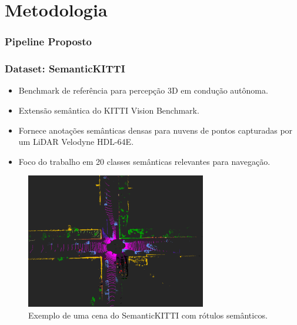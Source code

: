 \documentclass[aspectratio=169,t,xcolor=table]{beamer}
\begin{document}
\section{Metodologia}

\begin{frame}
    \frametitle{Pipeline Proposto}
    \begin{figure}
        \centering
    \end{figure}
\end{frame}

\begin{frame}
    \frametitle{Dataset: SemanticKITTI}
    \begin{itemize}
        \item Benchmark de referência para percepção 3D em condução autônoma.
        \item Extensão semântica do KITTI Vision Benchmark.
        \item Fornece anotações semânticas densas para nuvens de pontos capturadas por um LiDAR Velodyne HDL-64E.
        \item Foco do trabalho em 20 classes semânticas relevantes para navegação.
    \end{itemize}
    \begin{figure}
        \centering
        \includegraphics[width=0.7\textwidth]{figs/final-true1t.png}
        \caption{Exemplo de uma cena do SemanticKITTI com rótulos semânticos.}
    \end{figure}
\end{frame}
\end{document}

